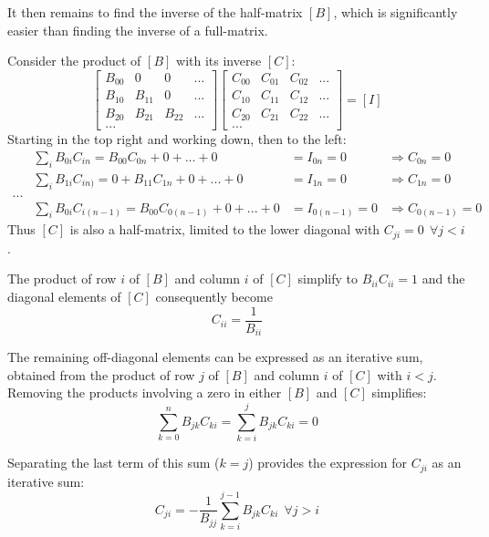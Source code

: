 \documentclass[11pt,fleqn]{report}
\begin{document}
It then remains to find the inverse of the half-matrix $[B]$, which is
significantly easier than finding the inverse of a full-matrix.

Consider the product of $[B]$ with its inverse $[C]$:
\begin{equation*}
\begin{bmatrix} B_{00} &0 &0 & ... \\
B_{10} & B_{11} &0 & ... \\
B_{20} & B_{21} & B_{22} & ... \\
 ...
\end{bmatrix}
\begin{bmatrix} C_{00} & C_{01} & C_{02} & ... \\
C_{10} & C_{11} & C_{12} & ... \\
C_{20} & C_{21} & C_{22} & ... \\
 ...
\end{bmatrix}
= [I]
\end{equation*}
Starting in the top right and working down, then to the left:
\begin{align*}
 &\sum_i B_{0i} C_{i n} = B_{00} C_{0n} + 0 + ... + 0
 &=I_{0n} = 0
 &\Rightarrow C_{0n} = 0 \\
 &\sum_i B_{1i} C_{in)} = 0 + B_{11} C_{1n} + 0 + ... + 0
 &=I_{1n} = 0
 &\Rightarrow C_{1n} = 0 \\
 ... \\
 &\sum_i B_{0i} C_{i (n-1)} = B_{00} C_{0(n-1)} + 0 + ... + 0
 &=I_{0(n-1)} = 0
 &\Rightarrow C_{0(n-1)} = 0
\end{align*}
Thus $[C]$ is also a half-matrix, limited to the lower diagonal with $C_{ji}
= 0 ~~\forall j<i$.

The product of row $i$ of $[B]$ and column $i$ of $[C]$ simplify to $B_{ii}
C_{ii} = 1$ and the diagonal elements of $[C]$ consequently become
\begin{equation*}
C_{ii} = \frac{1}{B_{ii}}
\end{equation*}

The remaining off-diagonal elements can be expressed as an iterative sum,
obtained from the product of row $j$ of $[B]$ and column $i$ of $[C]$ with
$i<j$. Removing the products involving a zero in either $[B]$ and $[C]$
simplifies:
\begin{equation*}
\sum_{k=0}^{n} B_{jk}C_{ki} =
\sum_{k=i}^{j} B_{jk}C_{ki} = 0
\end{equation*}

Separating the last term of this sum ($k=j$) provides the expression for
$C_{ji}$ as an iterative sum:
\begin{equation*}
C_{ji} = -\frac{1}{B_{jj}} \sum_{k=i}^{j-1} B_{jk}C_{ki} ~~\forall j>i
\end{equation*}
\end{document}
